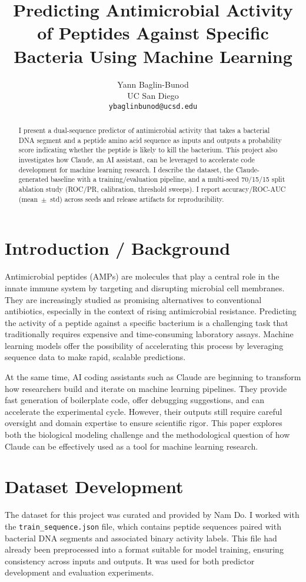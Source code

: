 \documentclass{article}
\title{Predicting Antimicrobial Activity of Peptides Against Specific Bacteria Using Machine Learning}
\author{Yann Baglin-Bunod \\
UC San Diego \\
\texttt{ybaglinbunod@ucsd.edu}}
\begin{document}
\maketitle

\begin{abstract}
I present a dual-sequence predictor of antimicrobial activity that takes a bacterial DNA segment and a peptide amino acid sequence as inputs and outputs a probability score indicating whether the peptide is likely to kill the bacterium. This project also investigates how Claude, an AI assistant, can be leveraged to accelerate code development for machine learning research. I describe the dataset, the Claude-generated baseline with a training/evaluation pipeline, and a multi-seed 70/15/15 split ablation study (ROC/PR, calibration, threshold sweeps). I report accuracy/ROC-AUC (mean~$\pm$~std) across seeds and release artifacts for reproducibility.
\end{abstract}


\section{Introduction / Background}
Antimicrobial peptides (AMPs) are molecules that play a central role in the innate immune system by targeting and disrupting microbial cell membranes. They are increasingly studied as promising alternatives to conventional antibiotics, especially in the context of rising antimicrobial resistance. Predicting the activity of a peptide against a specific bacterium is a challenging task that traditionally requires expensive and time-consuming laboratory assays. Machine learning models offer the possibility of accelerating this process by leveraging sequence data to make rapid, scalable predictions.

At the same time, AI coding assistants such as Claude are beginning to transform how researchers build and iterate on machine learning pipelines. They provide fast generation of boilerplate code, offer debugging suggestions, and can accelerate the experimental cycle. However, their outputs still require careful oversight and domain expertise to ensure scientific rigor. This paper explores both the biological modeling challenge and the methodological question of how Claude can be effectively used as a tool for machine learning research.

\section{Dataset Development}
The dataset for this project was curated and provided by Nam Do. I worked with the \texttt{train\_sequence.json} file, which contains peptide sequences paired with bacterial DNA segments and associated binary activity labels. This file had already been preprocessed into a format suitable for model training, ensuring consistency across inputs and outputs. It was used for both predictor development and evaluation experiments.
\end{document}
